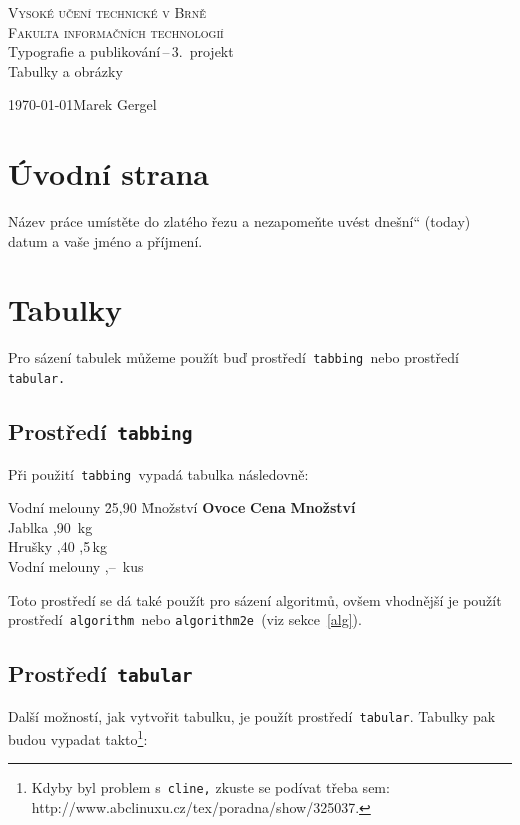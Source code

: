 \documentclass[a4paper, 11pt]{article}
\providecommand{\uv}[1]{\quotedblbase#1\textquotedblleft}
\begin{document}
\thispagestyle{empty}
\begin{titlepage}
    \begin{center}
        \textsc{\Huge Vysoké učení technické v Brně\\ \medskip
        \huge Fakulta informačních technologií}\\ \bigskip
        {\LARGE Typografie a publikování\,--\,3.\ projekt\medskip \\} 
        {\Huge Tabulky a obrázky}
    \end{center}
    {\Large \today \hfill Marek Gergel \\}
\end{titlepage}

\section{Úvodní strana}
Název práce umístěte do zlatého řezu a nezapomeňte uvést \uv{dnešní} (today) datum a vaše jméno a příjmení.

\section{Tabulky}
Pro sázení tabulek můžeme použít buď prostředí\verb| tabbing |nebo prostředí\verb| tabular.|

\subsection{Prostředí\texttt{ tabbing}}
Při použití\verb| tabbing |vypadá tabulka následovně:
\begin{tabbing}
    Vodní melouny \quad \= 25,90 \quad \= Množství \kill
    \textbf{Ovoce} \> \textbf{Cena} \> \textbf{Množství} \\
    Jablka ,90 \,kg \\
    Hrušky ,40 ,5\,kg \\
    Vodní melouny ,-- \,kus \\
\end{tabbing}
\noindent Toto prostředí se dá také použít pro sázení algoritmů, ovšem vhodnější je použít prostředí\verb| algorithm |nebo \verb|algorithm2e |(viz sekce~\ref{alg}).

\subsection{Prostředí\texttt{ tabular}}
Další možností, jak vytvořit tabulku, je použít prostředí\verb| tabular|. Tabulky pak budou vypadat takto\footnote{Kdyby byl problem s\texttt{ cline,} zkuste se podívat třeba sem: http://www.abclinuxu.cz/tex/poradna/show/325037.}:
\bigskip
\end{document}
